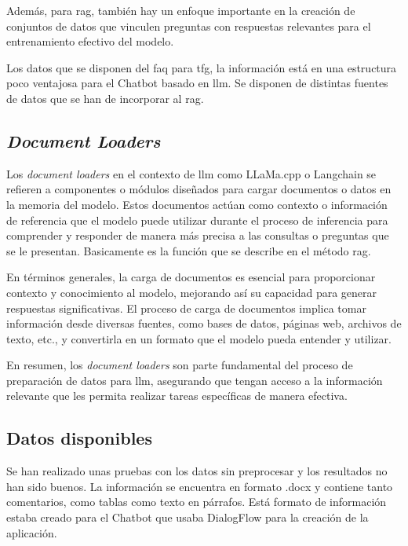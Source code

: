 Además, para \acrshort{rag}, también hay un enfoque importante en la creación de conjuntos de datos que vinculen preguntas con respuestas relevantes para el entrenamiento efectivo del modelo. 

Los datos que se disponen del \acrshort{faq} para \acrshort{tfg}, la información está en una estructura poco ventajosa para el Chatbot basado en \acrshort{llm}. Se disponen de distintas fuentes de datos que se han de incorporar al \acrshort{rag}.

\subsection{\textit{Document Loaders}}

Los \textit{document loaders} en el contexto de \acrlong{llm} como LLaMa.cpp o Langchain se refieren a componentes o módulos diseñados para cargar documentos o datos en la memoria del modelo. Estos documentos actúan como contexto o información de referencia que el modelo puede utilizar durante el proceso de inferencia para comprender y responder de manera más precisa a las consultas o preguntas que se le presentan. Basicamente es la función que se describe en el método \acrshort{rag}.

En términos generales, la carga de documentos es esencial para proporcionar contexto y conocimiento al modelo, mejorando así su capacidad para generar respuestas significativas. El proceso de carga de documentos implica tomar información desde diversas fuentes, como bases de datos, páginas web, archivos de texto, etc., y convertirla en un formato que el modelo pueda entender y utilizar.


En resumen, los \textit{document loaders} son parte fundamental del proceso de preparación de datos para \acrlong{llm}, asegurando que tengan acceso a la información relevante que les permita realizar tareas específicas de manera efectiva.

\subsection{Datos disponibles}

Se han realizado unas pruebas con los datos sin preprocesar y los resultados no han sido buenos. La información se encuentra en formato .docx y contiene tanto comentarios, como tablas como texto en párrafos. Está formato de información estaba creado para el Chatbot que usaba DialogFlow para la creación de la aplicación. 

